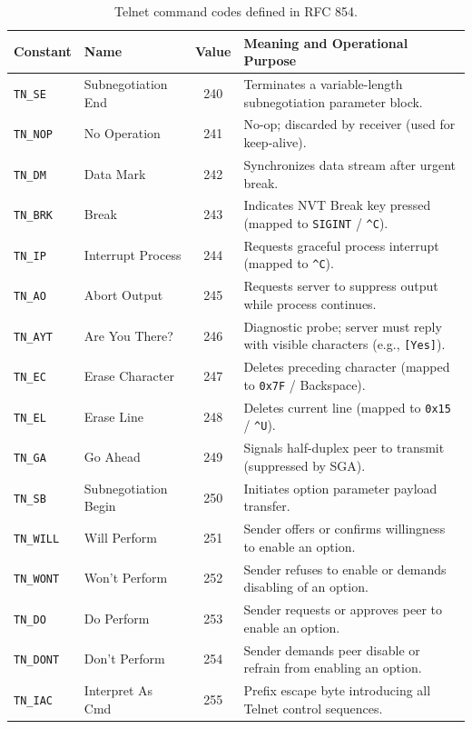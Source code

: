 \begin{table}[htbp]
\centering
\small
\begin{tabular}{@{}llcp{8.2cm}@{}}
\toprule
\textbf{Constant} & \textbf{Name} & \textbf{Value} & \textbf{Meaning and Operational Purpose} \\
\midrule
\texttt{TN\_SE}   & Subnegotiation End & 240 & Terminates a variable-length subnegotiation parameter block. \\
\texttt{TN\_NOP}  & No Operation       & 241 & No-op; discarded by receiver (used for keep-alive). \\
\texttt{TN\_DM}   & Data Mark          & 242 & Synchronizes data stream after urgent break. \\
\texttt{TN\_BRK}  & Break              & 243 & Indicates NVT Break key pressed (mapped to \texttt{SIGINT} / \texttt{\^{}C}). \\
\texttt{TN\_IP}   & Interrupt Process  & 244 & Requests graceful process interrupt (mapped to \texttt{\^{}C}). \\
\texttt{TN\_AO}   & Abort Output       & 245 & Requests server to suppress output while process continues. \\
\texttt{TN\_AYT}  & Are You There?     & 246 & Diagnostic probe; server must reply with visible characters (e.g., \texttt{[Yes]}). \\
\texttt{TN\_EC}   & Erase Character    & 247 & Deletes preceding character (mapped to \texttt{0x7F} / Backspace). \\
\texttt{TN\_EL}   & Erase Line         & 248 & Deletes current line (mapped to \texttt{0x15} / \texttt{\^{}U}). \\
\texttt{TN\_GA}   & Go Ahead           & 249 & Signals half-duplex peer to transmit (suppressed by SGA). \\
\texttt{TN\_SB}   & Subnegotiation Begin & 250 & Initiates option parameter payload transfer. \\
\texttt{TN\_WILL} & Will Perform       & 251 & Sender offers or confirms willingness to enable an option. \\
\texttt{TN\_WONT} & Won't Perform      & 252 & Sender refuses to enable or demands disabling of an option. \\
\texttt{TN\_DO}   & Do Perform         & 253 & Sender requests or approves peer to enable an option. \\
\texttt{TN\_DONT} & Don't Perform      & 254 & Sender demands peer disable or refrain from enabling an option. \\
\texttt{TN\_IAC}  & Interpret As Cmd   & 255 & Prefix escape byte introducing all Telnet control sequences. \\
\bottomrule
\end{tabular}
\caption{Telnet command codes defined in RFC 854.}
\label{tab:telnet_commands}
\end{table}

